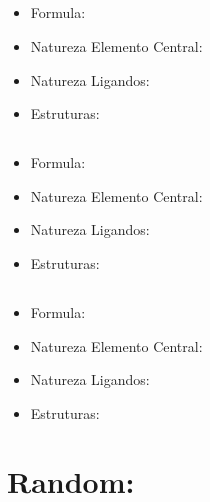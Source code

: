 \documentclass[12pt]{article}
\begin{document}
\subsection{}
\begin{itemize}

	\item Formula: \ch{  }
	
	\item Natureza Elemento Central:
	
	\item Natureza Ligandos:
	
	\item Estruturas:

\end{itemize}



\subsection{}
\begin{itemize}

	\item Formula: \ch{  }
	
	\item Natureza Elemento Central:
	
	\item Natureza Ligandos:
	
	\item Estruturas:

\end{itemize}



\subsection{}
\begin{itemize}

	\item Formula: \ch{  }
	
	\item Natureza Elemento Central:
	
	\item Natureza Ligandos:
	
	\item Estruturas:

\end{itemize}




\section{Random:}

\subsection{}
\end{document}
